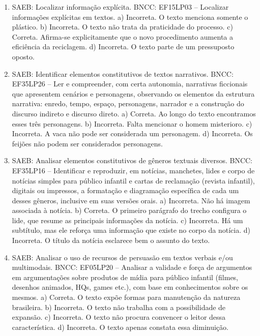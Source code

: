 \begin{enumerate}

\item
SAEB: Localizar informação explícita. BNCC: EF15LP03 – Localizar
informações explícitas em textos.
a) Incorreta. O texto menciona somente o plástico.
b) Incorreta. O texto não trata da praticidade do processo.
c) Correta. Afirma-se explicitamente que o novo procedimento
aumenta a eficiência da reciclagem.
d) Incorreta. O texto parte de um pressuposto oposto.

\item
SAEB: Identificar elementos constitutivos de textos narrativos. BNCC:
EF35LP26 – Ler e compreender, com certa autonomia, narrativas ficcionais
que apresentem cenários e personagens, observando os elementos da
estrutura narrativa: enredo, tempo, espaço, personagens, narrador e a
construção do discurso indireto e discurso direto.
a) Correta. Ao longo do texto encontramos esses três personagens.
b) Incorreta. Falta mencionar o homem misterioro.
c) Incorreta. A vaca não pode ser considerada um personagem.
d) Incorreta. Os feijões não podem ser considerados personagens.

\item
SAEB: Analisar elementos constitutivos de gêneros textuais diversos.
BNCC: EF35LP16 – Identificar e reproduzir, em notícias, manchetes, lides
e corpo de notícias simples para público infantil e cartas de reclamação
(revista infantil), digitais ou impressos, a formatação e diagramação
específica de cada um desses gêneros, inclusive em suas versões orais.
a) Incorreta. Não há imagem associada à notícia.
b) Correta. O primeiro parágrafo do trecho configura o lide, que resume as principais informações da notícia.
c) Incorreta. Há um subtítulo, mas ele reforça uma informação que existe no corpo da notícia.
d) Incorreta. O título da notícia esclarece bem o assunto do texto.

\item
SAEB: Analisar o uso de recursos de persuasão em textos verbais e/ou
multimodais. BNCC: EF05LP20 – Analisar a validade e força de argumentos
em argumentações sobre produtos de mídia para público infantil (filmes,
desenhos animados, HQs, games etc.), com base em conhecimentos sobre os
mesmos.
a) Correta. O texto expõe formas para manutenção da natureza brasileira.
b) Incorreta. O texto não trabalha com a possibilidade de expansão.
c) Incorreta. O texto não procura convencer o leitor dessa característica.
d) Incorreta. O texto apenas constata essa diminuição.


\end{enumerate}
